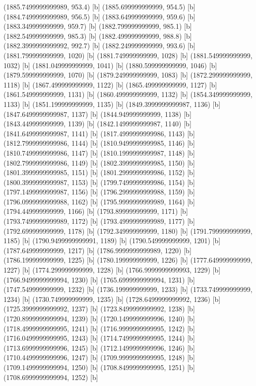 {{{(1885.7499999999989, 953.4) [b] 
(1885.699999999999, 954.5) [b] 
(1884.7499999999989, 956.5) [b] 
(1883.649999999999, 959.6) [b] 
(1883.349999999999, 959.7) [b] 
(1882.799999999999, 985.1) [b] 
(1882.549999999999, 985.3) [b] 
(1882.499999999999, 988.8) [b] 
(1882.3999999999992, 992.7) [b] 
(1882.249999999999, 993.6) [b] 
(1881.799999999999, 1020) [b] 
(1881.749999999999, 1028) [b] 
(1881.549999999999, 1032) [b] 
(1881.049999999999, 1041) [b] 
(1880.599999999999, 1046) [b] 
(1879.599999999999, 1070) [b] 
(1879.249999999999, 1083) [b] 
(1872.299999999999, 1118) [b] 
(1867.499999999999, 1122) [b] 
(1865.499999999999, 1127) [b] 
(1861.549999999999, 1131) [b] 
(1860.499999999999, 1132) [b] 
(1854.349999999999, 1133) [b] 
(1851.199999999999, 1135) [b] 
(1849.3999999999987, 1136) [b] 
(1847.6499999999987, 1137) [b] 
(1844.949999999999, 1138) [b] 
(1843.449999999999, 1139) [b] 
(1842.1499999999987, 1140) [b] 
(1841.6499999999987, 1141) [b] 
(1817.4999999999986, 1143) [b] 
(1812.7999999999986, 1144) [b] 
(1810.9499999999985, 1146) [b] 
(1810.7499999999986, 1147) [b] 
(1810.1999999999987, 1148) [b] 
(1802.7999999999986, 1149) [b] 
(1802.3999999999985, 1150) [b] 
(1801.3999999999985, 1151) [b] 
(1801.2999999999986, 1152) [b] 
(1800.3999999999987, 1153) [b] 
(1799.7499999999986, 1154) [b] 
(1797.1499999999987, 1156) [b] 
(1796.2999999999988, 1159) [b] 
(1796.0999999999988, 1162) [b] 
(1795.9999999999989, 1164) [b] 
(1794.449999999999, 1166) [b] 
(1793.899999999999, 1171) [b] 
(1793.7499999999989, 1172) [b] 
(1793.4999999999989, 1177) [b] 
(1792.699999999999, 1178) [b] 
(1792.349999999999, 1180) [b] 
(1791.799999999999, 1185) [b] 
(1790.9499999999991, 1189) [b] 
(1790.549999999999, 1201) [b] 
(1787.649999999999, 1217) [b] 
(1786.9999999999989, 1220) [b] 
(1786.199999999999, 1225) [b] 
(1780.199999999999, 1226) [b] 
(1777.649999999999, 1227) [b] 
(1774.299999999999, 1228) [b] 
(1766.9999999999993, 1229) [b] 
(1766.9499999999994, 1230) [b] 
(1765.6999999999994, 1231) [b] 
(1747.549999999999, 1232) [b] 
(1736.199999999999, 1233) [b] 
(1733.749999999999, 1234) [b] 
(1730.749999999999, 1235) [b] 
(1728.6499999999992, 1236) [b] 
(1725.3999999999992, 1237) [b] 
(1723.8499999999992, 1238) [b] 
(1720.8999999999994, 1239) [b] 
(1720.1499999999996, 1240) [b] 
(1718.4999999999995, 1241) [b] 
(1716.9999999999995, 1242) [b] 
(1716.0499999999995, 1243) [b] 
(1714.7499999999995, 1244) [b] 
(1713.6999999999996, 1245) [b] 
(1712.1499999999996, 1246) [b] 
(1710.4499999999996, 1247) [b] 
(1709.9999999999995, 1248) [b] 
(1709.1499999999994, 1250) [b] 
(1708.8499999999995, 1251) [b] 
(1708.6999999999994, 1252) [b] 
}}}

